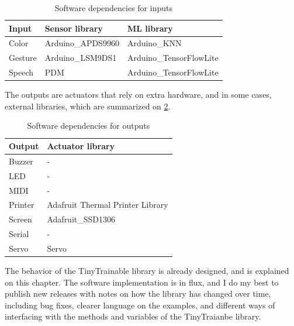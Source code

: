 \begin{table}[ht]
    \centering
    \begin{tabular}{ | l | l | l |}
        \hline
        \textbf{Input}  & \textbf{Sensor library} & \textbf{\acrshort{ML} library} \\
        \hline
        Color &  Arduino{\_}APDS9960 & Arduino{\_}KNN \\
        \hline
        Gesture & Arduino{\_}LSM9DS1 & Arduino{\_}TensorFlowLite \\
        \hline
        Speech & PDM & Arduino{\_}TensorFlowLite \\
        \hline
    \end{tabular}
    \caption{Software dependencies for inputs}
    \label{software-dependencies-inputs}
\end{table}{}

The outputs are actuators that  rely on extra hardware, and in some cases, external libraries, which are summarized on \ref{software-dependencies-outputs}.

\begin{table}[ht]
    \centering
    \begin{tabular}{ | l | l | }
        \hline
        \textbf{Output}  & \textbf{Actuator library} \\
        \hline
        Buzzer & - \\
        \hline
        \acrshort{LED} & - \\
        \hline
        \acrshort{MIDI} & - \\
        \hline
        Printer & Adafruit Thermal Printer Library\\
        \hline
        Screen & Adafruit{\_}SSD1306\\ 
        \hline
        Serial & - \\
        \hline
        Servo & Servo\\
        \hline
    \end{tabular}
    \caption{Software dependencies for outputs}
    \label{software-dependencies-outputs}
\end{table}{}

The behavior of the TinyTrainable library is already designed, and is explained on this chapter. The software implementation is in flux, and I do my best to publish new releases with notes on how the library has changed over time, including bug fixes, clearer language on the examples, and different ways of interfacing with the methods and variables of the TinyTraianbe library.

